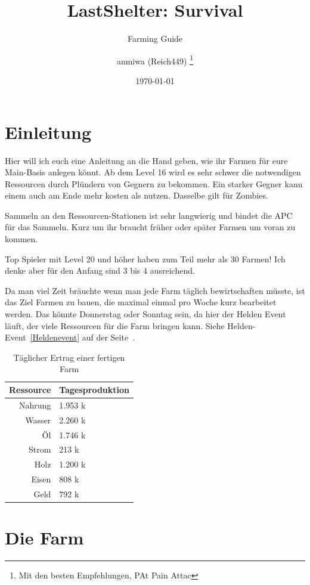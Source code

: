 \documentclass[fontsize=12pt,a4paper]{scrartcl}[2003/01/01]
\title{LastShelter: Survival}
\subtitle{Farming Guide}
\author{\textcopyleft{} anmiwa (Reich449)%
  \thanks{Mit den besten Empfehlungen, PAt Pain Attac}}
\date{\today}               %
\begin{document}
\maketitle                  %
\tableofcontents            %
\listoffigures

\section{Einleitung}
Hier will ich euch eine Anleitung an die Hand geben, wie ihr Farmen für eure Main-Basis anlegen könnt.
Ab dem Level 16 wird es sehr schwer die notwendigen Ressourcen durch Plündern von Gegnern zu bekommen.
Ein starker Gegner kann einem auch am Ende mehr kosten als nutzen. Dasselbe gilt für Zombies.

Sammeln an den Ressourcen-Stationen ist sehr langwierig und bindet die APC für das Sammeln.
Kurz um ihr braucht früher oder später Farmen um voran zu kommen.

Top Spieler mit Level 20 und höher haben zum Teil mehr als 30 Farmen! Ich denke aber für den Anfang sind 3 bis 4 ausreichend.

Da man viel Zeit bräuchte wenn man jede Farm täglich bewirtschaften müsste, ist das Ziel Farmen zu bauen,
die maximal einmal pro Woche kurz bearbeitet werden. Das könnte Donnerstag oder Sonntag sein,
da hier der Helden Event läuft, der viele Ressourcen für die Farm bringen kann.
Siehe Helden-Event~\ref{Heldenevent} auf der Seite~\pageref{Heldenevent}.

\begin{table}[ht]
  \centering
\begin{tabularx}{0.6\textwidth}{rl}
  Ressource & Tagesproduktion \\
  \hline
  Nahrung & 1.953 k \\
  Wasser & 2.260 k \\
  Öl & 1.746 k \\
  Strom & 213 k \\
  Holz & 1.200 k \\
  Eisen & 808 k \\
  Geld & 792 k \\
\end{tabularx}
    \caption[Ertrag]{Täglicher Ertrag einer fertigen Farm}
\end{table}


\section{Die Farm}
\end{document}
